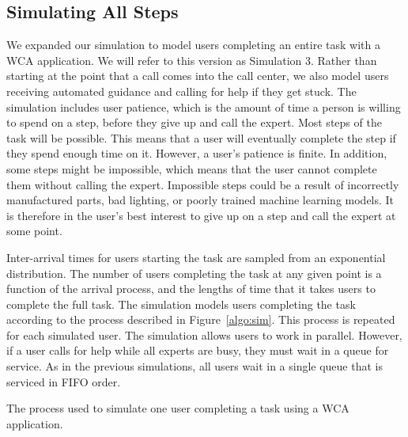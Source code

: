 \subsection{Simulating All Steps}

We expanded our simulation to model users completing an entire task with a WCA
application.
We will refer to this version as Simulation 3.
Rather than starting at the point that a call comes into the call center, we
also model users receiving automated guidance and calling for help if they get
stuck.
The simulation includes user patience, which is the amount of time a person is
willing to spend on a step, before they give up and call the expert.
Most steps of the task will be possible.
This means that a user will eventually complete the step if they spend enough
time on it.
However, a user's patience is finite.
In addition, some steps might be impossible, which means that the user cannot
complete them without calling the expert.
Impossible steps could be a result of incorrectly manufactured parts, bad
lighting, or poorly trained machine learning models.
It is therefore in the user's best interest to give up on a step and call the
expert at some point.

Inter-arrival times for users starting the task are sampled from an exponential
distribution.
The number of users completing the task at any given point is a function of the
arrival process, and the lengths of time that it takes users to complete the
full task.
The simulation models users completing the task according to the process
described in Figure~\ref{algo:sim}.
This process is repeated for each simulated user.
The simulation allows users to work in parallel.
However, if a user calls for help while all experts are busy, they must wait in
a queue for service.
As in the previous simulations, all users wait in a single queue that is
serviced in FIFO order.

\begin{algorithm}[H]
  \caption{
    The process used to simulate one user completing a task using a WCA
    application.
  }\label{algo:sim}
\end{algorithm}

